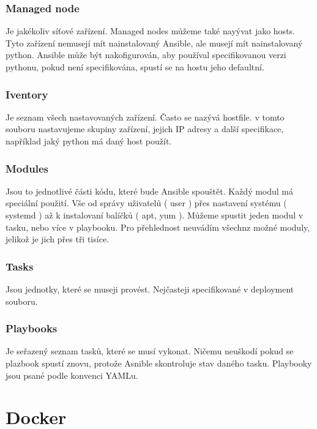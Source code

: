 \documentclass[thesis=B,czech]{FITthesis}[2019/12/23]
\begin{document}
\subsubsection{Managed node}

Je jakékoliv síťové zařízení. Managed nodes můžeme také nayývat jako hosts. Tyto zařízení nemusejí mít nainstalovaný Ansible, ale musejí mít nainstalovaný python. Ansible může být nakofigurován, aby používal specifikovanou verzi pythonu, pokud není specifikována, spustí se na hostu jeho defaultní.

\subsubsection{Iventory}

Je seznam všech nastavovaných zařízení. Často se nazývá hostfile. v tomto souboru nastavujeme skupiny zařízení, jejich IP adresy a další specifikace, například jaký python má daný host použít. 

\subsubsection{Modules}

Jsou to jednotlivé části kódu, které bude Ansible spouštět. Každý modul má speciální použití. Vše od správy uživatelů ( user ) přes nastavení systému ( systemd ) až k instalovaní balíčků ( apt, yum ). Můžeme spustit jeden modul v tasku, nebo více v playbooku. Pro přehlednost neuvádím všechnz možné moduly, jelikož je jich přes tři tisíce. 

\subsubsection{Tasks}

Jsou jednotky, které se museji provést. Nejčasteji specifikované v deployment souboru. 

\subsubsection{Playbooks}

Je seřazený seznam tasků, které se musí vykonat. Ničemu neuškodí pokud se plazbook spustí znovu, protože Asnible skontroluje stav daného tasku. Playbooky jsou psané podle konvenci YAMLu. 



\section{Docker}
\end{document}
